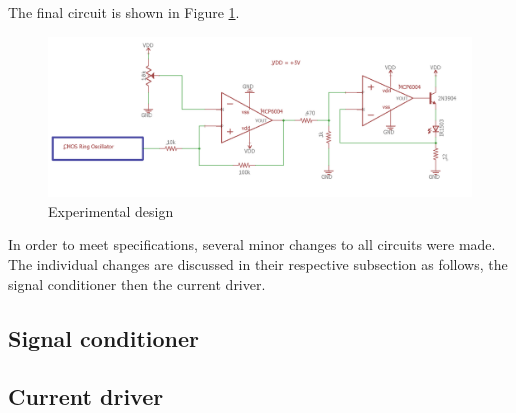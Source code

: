 
The final circuit is shown in Figure \ref{fig:finalexperimentalschem}.

\begin{figure}[H]
	\centering
	\includegraphics[width=0.7\linewidth]{ExperimentalImplementation/FINAlexperimentalSchem}
	\caption[Final circuit]{Experimental design}
	\label{fig:finalexperimentalschem}
\end{figure}

In order to meet specifications, several minor changes to all circuits were made. The individual changes are discussed in their respective subsection as follows, the signal conditioner then the current driver.


%


\subsection{Signal conditioner}


\subsection{Current driver}

	
